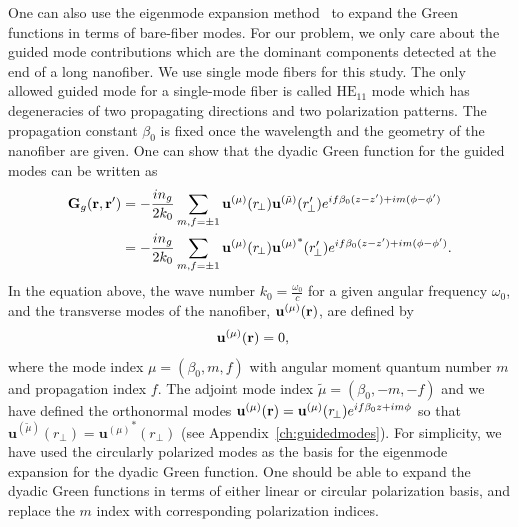 \documentclass[preprint,aps,pra,onecolumn]{revtex4-1} %
\begin{document}
One can also use the eigenmode expansion method~\cite{Glauber1991,Sondergaard2001a} to expand the 
Green functions in terms of bare-fiber modes. For our problem, we only care about the guided mode 
contributions which are the dominant components detected at the end of a long nanofiber. We use 
single mode fibers for this study. The only allowed guided mode for a single-mode fiber is called 
\textit{$\mathrm{HE}_{11}$} mode which has degeneracies of two propagating directions and two 
polarization patterns. The propagation constant $\beta_0$ is fixed once the wavelength and the 
geometry of the nanofiber are given. One can show that the dyadic Green function for the guided modes 
can be written as~\cite{Sondergaard2001a}
\begin{align}
\mathbf{G}_g(\mathbf{r},\mathbf{r}') &=-\frac{in_g}{2k_0} \sum_{m,f=\pm 1} 
\mathbf{u}^{(\mu)}(r\!_\perp)\mathbf{u}^{(\tilde{\mu})}(r_{\!\perp}^\prime)e^{if\beta_0(z-z')+im(\phi-\phi')}\\
&= -\frac{in_g}{2k_0} \sum_{m,f=\pm 1} 
\mathbf{u}^{(\mu)}(r\!_\perp){\mathbf{u}^{(\mu)}}^*(r_{\!\perp}^\prime)e^{if\beta_0(z-z')+im(\phi-\phi')}.
\end{align}
In the equation above, the wave number $k_0=\frac{\omega_0}{c}$ for a given angular frequency $\omega_0$, and the transverse modes of the nanofiber, $\mathbf{u}^{(\mu)}(\mathbf{r})$, are defined by
\begin{align}
[-\nabla\times\nabla + \frac{\omega_0^2}{c^2}n^2(\br)]  \mathbf{u}^{(\mu)}(\br) &=0,
\end{align}
where the mode index $\mu=(\beta_0,m,f)$ with angular moment quantum number $ m $ and propagation index $ f $. The adjoint mode index $\tilde{\mu}=(\beta_0,-m,-f)$ and we have defined the orthonormal modes $\mathbf{u}^{(\mu)}(\mathbf{r})=\mathbf{u}^{(\mu)}(r_{\!\perp})e^{if\beta_0z+im\phi}$ so that $\mathbf{u}^{(\tilde{\mu})}(r_{\!\perp})={\mathbf{u}^{(\mu)}}^*(r_{\!\perp})$ (see Appendix~\ref{ch:guidedmodes}). For simplicity, we have used the circularly polarized modes as the basis for the eigenmode expansion for the dyadic Green function. One should be able to expand the dyadic Green functions in terms of either linear or circular polarization basis, and replace the $m$ index with corresponding polarization indices. 
\end{document}
